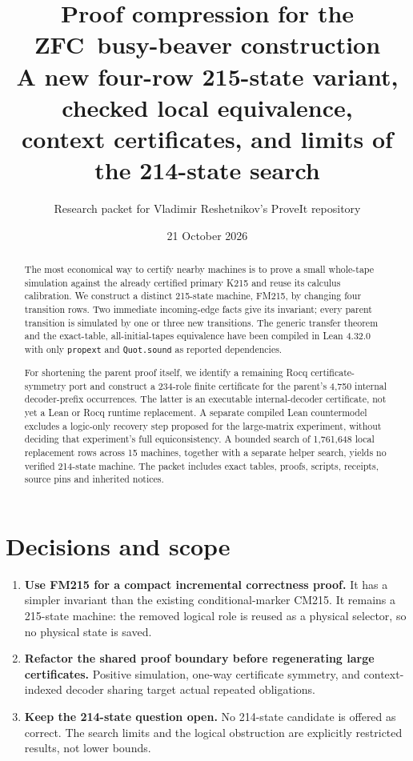 \documentclass[11pt,a4paper]{article}
\title{Proof compression for the ZFC\ busy-beaver construction\\[5pt]
\large A new four-row 215-state variant, checked local equivalence,\\
context certificates, and limits of the 214-state search}
\author{Research packet for Vladimir Reshetnikov's ProveIt repository}
\date{21 October 2026}
\begin{document}
\maketitle
\begin{abstract}
The most economical way to certify nearby machines is to prove a small
whole-tape simulation against the already certified primary K215 and reuse
its calculus calibration. We construct a distinct 215-state machine,
FM215, by changing four transition rows. Two immediate incoming-edge facts
give its invariant; every parent transition is simulated by one or three
new transitions. The generic transfer theorem and the exact-table,
all-initial-tapes equivalence have been compiled in Lean 4.32.0 with only
\texttt{propext} and \texttt{Quot.sound} as reported dependencies.

For shortening the parent proof itself, we identify a remaining Rocq
certificate-symmetry port and construct a 234-role finite certificate for
the parent's 4,750 internal decoder-prefix occurrences. The latter is an
executable internal-decoder certificate, not yet a Lean or Rocq runtime
replacement. A separate compiled Lean countermodel excludes a logic-only
recovery step proposed for the large-matrix experiment, without deciding
that experiment's full equiconsistency. A bounded search of 1,761,648 local
replacement rows across 15 machines, together with a separate helper
search, yields no verified 214-state machine. The packet includes exact
tables, proofs, scripts, receipts, source pins and inherited notices.
\end{abstract}

\section*{Decisions and scope}
\begin{enumerate}
\item \textbf{Use FM215 for a compact incremental correctness proof.}
  It has a simpler invariant than the existing conditional-marker CM215.
  It remains a 215-state machine: the removed logical role is reused as
  a physical selector, so no physical state is saved.
\item \textbf{Refactor the shared proof boundary before regenerating large
  certificates.} Positive simulation, one-way certificate symmetry, and
  context-indexed decoder sharing target actual repeated obligations.
\item \textbf{Keep the 214-state question open.} No 214-state candidate
  is offered as correct. The search limits and the logical obstruction
  are explicitly restricted results, not lower bounds.
\end{enumerate}
\end{document}
